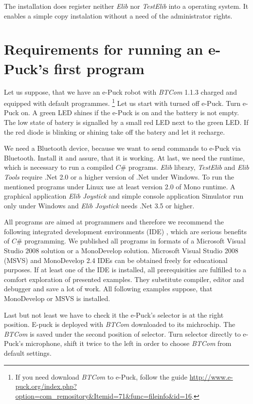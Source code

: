 \documentclass[12pt,notitlepage]{report}
\begin{document}
	The installation does register neither {\it Elib} nor {\it TestElib} into a operating system. It enables
	a simple copy instalation without a need of the administrator rights.
	\section{Requirements for running an e-Puck's first program}
	\label{sec:require}
	Let us suppose, that we have an e-Puck robot with {\it BTCom} 1.1.3 charged and equipped with default programmes.
	\footnote{\small{If you need download {\it BTCom} to e-Puck, follow the guide 
	\url{http://www.e-puck.org/index.php?option=com_remository&Itemid=71&func=fileinfo&id=16}.}}
	Let us start with turned off e-Puck. Turn e-Puck on.
	A green LED shines if the e-Puck is on and the battery is not empty.
	The low state of batery is signalled by a small red LED next to the green LED. 
	If the red diode is blinking or shining take off the batery and let it recharge.


	We need a Bluetooth device, because we want to send commands to e-Puck via Bluetooth. Install it and assure,
	that it is working.
	At last, we need the runtime, which is necessary to run a compiled $C\#$ programs. 
	{\it Elib} library, {\it TestElib} and {\it Elib Tools} require .Net 2.0 or a higher version of .Net under Windows.
	To run the mentioned programs under Linux use at least version 2.0 of Mono runtime.
	A graphical application {\it Elib Joystick} and simple console application Simulator
	run only under Windows and {\it Elib Joystick} needs .Net 3.5 or higher.

	All programs are aimed at programmers and therefore we recommend the following integrated development environments (IDE) ,
	which are serious benefits of $C\#$ programming.
	We published all programs in formats of a Microsoft Visual Studio 2008 solution or a MonoDevelop solution.  
	Microsoft Visual Studio 2008 (MSVS) and MonoDevelop 2.4 IDEs can be obtained freely for educational purposes.
	If at least one of the IDE is installed, all prerequisities are fulfilled to a comfort exploration of presented examples. 
	They substitute compiler, editor and debugger and save a lot of work.
	All following examples suppose, that MonoDevelop or MSVS is installed.

	Last but not least we have to check it the e-Puck's selector is at the right position.
	E-puck is deployed with {\it BTCom} downloaded to its michrochip. 
	The {\it BTCom} is saved under the second position of selector. 
	Turn selector directly to e-Puck's microphone, shift it twice to the left 
	in order to choose {\it BTCom} from default settings.
\end{document}
